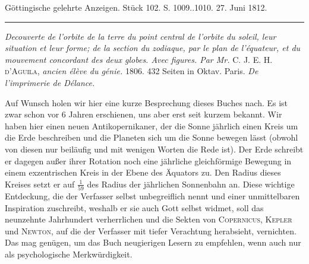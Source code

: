 \clearpage
{}
\hypertarget{native-546-middle}{}\label{native-546-middle}
\begin{center}\small Göttingische gelehrte Anzeigen. Stück 102. S. 1009..1010. 27. Juni 1812.\\[3pt]\rule{.72\linewidth}{.3pt}\end{center}

\emph{Decouverte de l'orbite de la terre du point central de l'orbite du soleil, leur situation et leur forme; de la section du zodiaque, par le plan de l'équateur, et du mouvement concordant des deux globes. Avec figures. Par Mr.} \textsc{C. J. E. H. d'Aguila}, \emph{ancien élève du génie.} 1806. 432 Seiten in Oktav. Paris. \emph{De l'imprimerie de Délance.}

Auf Wunsch holen wir hier eine kurze Besprechung dieses Buches nach. Es ist zwar schon vor 6 Jahren erschienen, uns aber erst seit kurzem bekannt. Wir haben hier einen neuen Antikopernikaner, der die Sonne jährlich einen Kreis um die Erde beschreiben und die Planeten sich um die Sonne bewegen lässt (obwohl von diesen nur beiläufig und mit wenigen Worten die Rede ist). Der Erde schreibt er dagegen außer ihrer Rotation noch eine jährliche gleichförmige Bewegung in einem exzentrischen Kreis in der Ebene des Äquators zu. Den Radius dieses Kreises setzt er auf $\frac{1}{59}$ des Radius der jährlichen Sonnenbahn an. Diese wichtige Entdeckung, die der Verfasser selbst unbegreiflich nennt und einer unmittelbaren Inspiration zuschreibt, weshalb er sie auch Gott selbst widmet, soll das neunzehnte Jahrhundert verherrlichen und die Sekten von \textsc{Copernicus}, \textsc{Kepler} und \textsc{Newton}, auf die der Verfasser mit tiefer Verachtung herabsieht, vernichten. Das mag genügen, um das Buch neugierigen Lesern zu empfehlen, wenn auch nur als psychologische Merkwürdigkeit.
